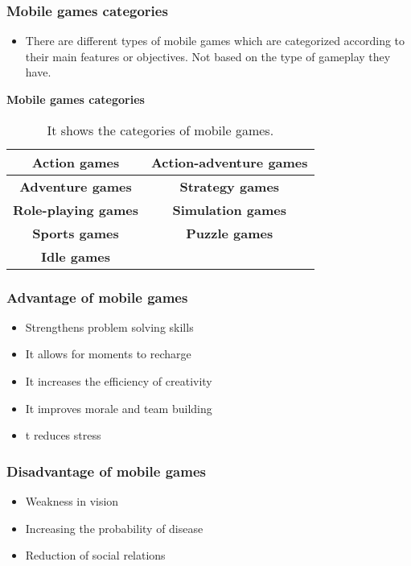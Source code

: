 \documentclass{beamer}
\begin{document}
\begin{frame}[fragile=singleslide]\frametitle{Mobile games categories}
\begin{itemize}
\item 
There are different types of mobile games which are categorized according to their main features or objectives. Not based on the type of gameplay they have.
\end{itemize}
\begin{table}[h]
\textbf{Mobile games categories}\\ 
\begin{tabular}{|c |c |}
 \hline\hline
  \textbf{Action games} & \textbf{Action-adventure games}\\ 
  \hline
  \textbf{Adventure games} & \textbf{Strategy games} \\
  
  \hline
 \textbf{Role-playing games} & \textbf{Simulation games} \\
 \hline
 \textbf{Sports games} &\textbf{ Puzzle games}\\ 
 \hline
 \textbf{Idle games} & \\
 \hline
\end{tabular}
\caption{It shows the categories of mobile games.}
\label{table:1}
\end{table}
\end{frame}


\begin{frame}[fragile=singleslide]\frametitle{Advantage of mobile games}
\begin{itemize}
    \item Strengthens problem solving skills
    \item It allows for moments to recharge
    \item It increases the efficiency of creativity
    \item It improves morale and team building
    \item t reduces stress
\end{itemize}
\end{frame}


\begin{frame}[fragile=singleslide]\frametitle{Disadvantage of mobile games}
\begin{itemize}
\item Weakness in vision
\item Increasing the probability of disease
\item Reduction of social relations
\end{itemize}
\end{frame}
\end{document}
